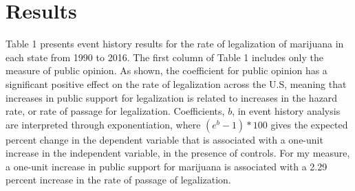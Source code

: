 \section{Results}

Table 1 presents event history results for the rate of legalization of marijuana in each state from 1990 to 2016. The first column of Table 1 includes only the measure of public opinion. As shown, the coefficient for public opinion has a significant positive effect on the rate of legalization across the U.S, meaning that increases in public support for legalization is related to increases in the hazard rate, or rate of passage for legalization. %
Coefficients, $b$, in event history analysis are interpreted through exponentiation, where $(e^{b} - 1)*100$ gives the expected percent change in the dependent variable that is associated with a one-unit increase in the independent variable, in the presence of controls. For my measure, a one-unit increase in public support for marijuana is associated with a 2.29 percent increase in the rate of passage of legalization.

%

%



%


%


%





